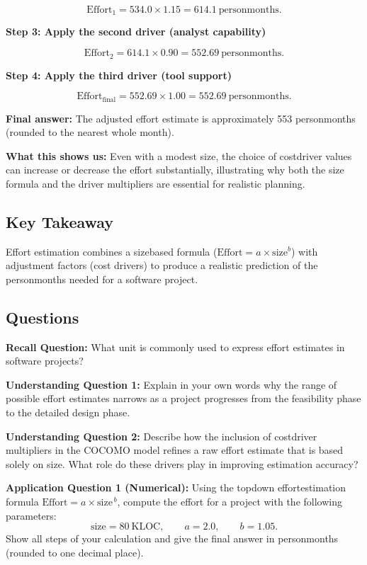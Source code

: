 \documentclass[12pt, a4paper]{article}
\begin{document}
\[
\text{Effort}_{1}= 534.0 \times 1.15 = 614.1\ \text{personmonths}.
\]

\textbf{Step 3: Apply the second driver (analyst capability)}  

\[
\text{Effort}_{2}= 614.1 \times 0.90 = 552.69\ \text{personmonths}.
\]

\textbf{Step 4: Apply the third driver (tool support)}  

\[
\text{Effort}_{\text{final}} = 552.69 \times 1.00 = 552.69\ \text{personmonths}.
\]

\textbf{Final answer:} The adjusted effort estimate is approximately 553 personmonths (rounded to the nearest whole month).  

\textbf{What this shows us:} Even with a modest size, the choice of costdriver values can increase or decrease the effort substantially, illustrating why both the size formula and the driver multipliers are essential for realistic planning.

\subsection{Key Takeaway}
Effort estimation combines a sizebased formula (\(\text{Effort}=a\times\text{size}^b\)) with adjustment factors (cost drivers) to produce a realistic prediction of the personmonths needed for a software project.

\subsection*{Questions}

\textbf{Recall Question:}  
What unit is commonly used to express effort estimates in software projects?  

\newpage

\textbf{Understanding Question 1:}  
Explain in your own words why the range of possible effort estimates narrows as a project progresses from the feasibility phase to the detailed design phase.  

\newpage

\textbf{Understanding Question 2:}  
Describe how the inclusion of costdriver multipliers in the COCOMO model refines a raw effort estimate that is based solely on size. What role do these drivers play in improving estimation accuracy?  

\newpage

\textbf{Application Question 1 (Numerical):}  
Using the topdown effortestimation formula \(\text{Effort}=a \times \text{size}^{\,b}\), compute the effort for a project with the following parameters:  
\[
\text{size}=80\ \text{KLOC},\qquad a=2.0,\qquad b=1.05.
\]  
Show all steps of your calculation and give the final answer in personmonths (rounded to one decimal place).  
\end{document}
